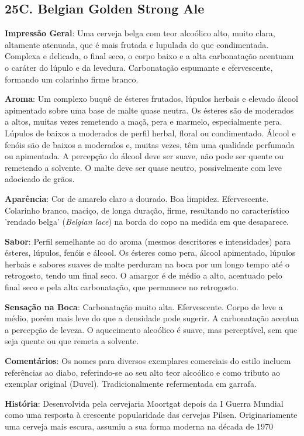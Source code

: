 \subsection*{25C. Belgian Golden Strong Ale}
\textbf{Impressão Geral}: Uma cerveja belga com teor alcoólico alto, muito clara, altamente atenuada, que é mais frutada e lupulada do que condimentada. Complexa e delicada, o final seco, o corpo baixo e a alta carbonatação acentuam o caráter do lúpulo e da levedura. Carbonatação espumante e efervescente, formando um colarinho firme branco.

\textbf{Aroma}: Um complexo buquê de ésteres frutados, lúpulos herbais e elevado álcool apimentado sobre uma base de malte quase neutra. Os ésteres são de moderados a altos, muitas vezes remetendo a maçã, pera e marmelo, especialmente pera. Lúpulos de baixos a moderados de perfil herbal, floral ou condimentado. Álcool e fenóis são de baixos a moderados e, muitas vezes, têm uma qualidade perfumada ou apimentada. A percepção do álcool deve ser suave, não pode ser quente ou remetendo a solvente. O malte deve ser quase neutro, possivelmente com leve adocicado de grãos.

\textbf{Aparência}: Cor de amarelo claro a dourado. Boa limpidez. Efervescente. Colarinho branco, maciço, de longa duração, firme, resultando no característico 'rendado belga' (\textit{Belgian lace}) na borda do copo na medida em que desaparece.

\textbf{Sabor}: Perfil semelhante ao do aroma (mesmos descritores e intensidades) para ésteres, lúpulos, fenóis e álcool. Os ésteres como pera, álcool apimentado, lúpulos herbais e sabores suaves de malte perduram na boca por um longo tempo até o retrogosto, tendo um final seco. O amargor é de médio a alto, acentuado pelo final seco e pela alta carbonatação, que permanece no retrogosto.

\textbf{Sensação na Boca}: Carbonatação muito alta. Efervescente. Corpo de leve a médio, porém mais leve do que a densidade pode sugerir. A carbonatação acentua a percepção de leveza. O aquecimento alcoólico é suave, mas perceptível, sem que seja quente ou que remeta a solvente.

\textbf{Comentários}: Os nomes para diversos exemplares comerciais do estilo incluem referências ao diabo, referindo-se ao seu alto teor alcoólico e como tributo ao exemplar original (Duvel). Tradicionalmente refermentada em garrafa.

\textbf{História}: Desenvolvida pela cervejaria Moortgat depois da I Guerra Mundial como uma resposta à crescente popularidade das cervejas Pilsen. Originariamente uma cerveja mais escura, assumiu a sua forma moderna na década de 1970

